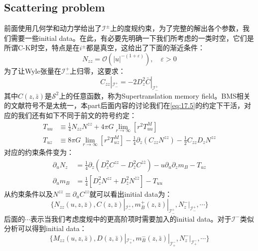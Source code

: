 \subsection{Scattering problem}
前面使用几何学和动力学给出了$\mathcal{I}^{\pm}$上的度规约束，为了完整的解出各个参数，我们需要一些initial data。在此，有必要先明确一下我们所考虑的一类时空，它们是所谓C-K时空\cite{ChristodoulouKlainerman+1994}，特点是在$i^{\pm}$都是真空，这给出了下面的渐近条件：
\[N_{zz}=\mathcal{O}\left(|u|^{-(1+\varepsilon)}\right),\quad\varepsilon>0\]
为了让Wyle张量在$\mathcal{I}^+_-$上归零，这要求\cite{Strominger:2013jfa,Compere:2019qed}：
\begin{equation}
	C_{zz}|_{\mathcal{I}_{-}^{+}}=-2D_{z}^{2}\bar{C}|_{\mathcal{I}_{-}^{+}}
\end{equation}
其中$C(z,\bar z)$是$\mathcal{S}^2$上的任意函数，称为Supertranslation memory field。BMS相关的文献符号不是太统一，本part后面内容的讨论我们在\ref{eq:17.5}的约定下干活，对应的我们还有如下不同于前文的符号约定：
\begin{equation}
	\begin{aligned}
	T_{uu}&\equiv\frac{1}{4}N_{zz}N^{zz}+4\pi G\lim_{r\to\infty}\left[r^2T_{uu}^M\right]	\\
	T_{uz}&\equiv8\pi G\lim_{r\rightarrow\infty}\left[r^{2}T_{uz}^{M}\right]-\frac{1}{4}\partial_{z}\left(C_{zz}N^{zz}\right)-\frac{1}{2}C_{zz}D_{z}N^{zz}
	\end{aligned}
\end{equation}
对应的约束条件变为：
\begin{equation}
\begin{aligned}
	\partial_{u}N_{z}&=\frac{1}{4}\partial_{z}\left(D_{z}^{2}C^{zz}-D_{\bar{z}}^{2}C^{\bar{z}\bar{z}}\right)-u\partial_{u}\partial_{z}m_{B}-T_{uz}\\
	\partial_{u}m_{B}&=\frac{1}{4}\left[D_{z}^{2}N^{zz}+D_{\bar{z}}^{2}N^{\bar{z}\bar{z}}\right]-T_{uu}
\end{aligned}
\end{equation}
从约束条件以及$N^{zz}\equiv\partial_u C^{zz}$就可以看出initial data为：
\begin{equation}
	\{N_{zz}(u,z,\bar{z}),C(z,\bar{z})|_{\mathcal{I}_{-}^{+}},m^+_{B}(z,\bar{z})|_{\mathcal{I}_{-}^{+}},N^-_z|_{\mathcal{I}^+_-},\cdots\}
\end{equation}
后面的$\cdots$表示当我们考虑度规中的更高阶项时需要加入的initial data。对于$\mathcal{I}^-$类似分析可以得到initial data：
\begin{equation}
	\{M_{zz}(u,z,\bar{z}),D(z,\bar{z})|_{\mathcal{I}_{+}^{-}},m^-_{B}(z,\bar{z})|_{\mathcal{I}_{+}^{-}},N^-_z|_{\mathcal{I}^-_+},\cdots\}
\end{equation}

